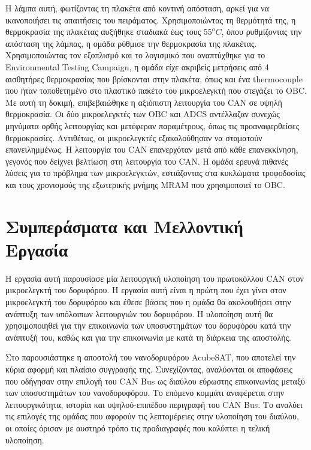 \documentclass[a4paper,nobib,justified]{tufte-book}
\begin{document}
Η λάμπα αυτή, φωτίζοντας τη πλακέτα από κοντινή απόσταση, αρκεί για να ικανοποιήσει τις απαιτήσεις του πειράματος. Χρησιμοποιώντας τη θερμότητά της, η θερμοκρασία της πλακέτας αυξήθηκε σταδιακά έως τους $55^o C$, όπου ρυθμίζοντας την απόσταση της λάμπας, η ομάδα ρύθμισε την θερμοκρασία της πλακέτας. Χρησιμοποιώντας τον εξοπλισμό και το λογισμικό που αναπτύχθηκε για το Environmental Testing Campaign, η ομάδα είχε ακριβείς μετρήσεις από 4 αισθητήρες θερμοκρασίας που βρίσκονται στην πλακέτα, όπως και ένα thermocouple που ήταν τοποθετημένο στο πλαστικό πακέτο του μικροελεγκτή που στεγάζει το OBC. Με αυτή τη δοκιμή, επιβεβαιώθηκε η αξιόπιστη λειτουργία του CAN σε υψηλή θερμοκρασία. Οι δύο μικροελεγκτές των OBC και ADCS αντέλλαζαν συνεχώς μηνύματα ορθής λειτουργίας και μετέφεραν παραμέτρους, όπως τις προαναφερθείσες θερμοκρασίες. Αντιθέτως, οι μικροελεγκτές εξακολούθησαν να σταματούν επανειλημμένως. Η λειτουργία του CAN επανερχόταν μετά από κάθε επανεκκίνηση, γεγονός που δείχνει βελτίωση στη λειτουργία του CAN. Η ομάδα ερευνά πιθανές λύσεις για το πρόβλημα των μικροελεγκτών, εστιάζοντας στα κυκλώματα τροφοδοσίας και τους χρονισμούς της εξωτερικής μνήμης MRAM που χρησιμοποιεί το OBC.

\chapter{Συμπεράσματα και Μελλοντική Εργασία}
\label{future-work}
Η εργασία αυτή παρουσίασε μία λειτουργική υλοποίηση του πρωτοκόλλου CAN στον μικροελεγκτή του δορυφόρου. Η εργασία αυτή είναι η πρώτη που έχει γίνει στον μικροελεγκτή του δορυφόρου και έθεσε βάσεις που η ομάδα θα ακολουθήσει στην ανάπτυξη των υπόλοιπων λειτουργιών του δορυφόρου. Η υλοποίηση αυτή θα χρησιμοποιηθεί για την επικοινωνία των υποσυστημάτων του δορυφόρου κατά την ανάπτυξή του, καθώς και για την επικοινωνία με κατά τη διάρκεια της αποστολής.

Στο  παρουσιάστηκε η αποστολή του νανοδορυφόρου AcubeSAT, που αποτελεί την κύρια αφορμή και πλαίσιο συγγραφής της. Συνεχίζοντας, αναλύονται οι αποφάσεις που οδήγησαν στην επιλογή του CAN Bus ως διαύλου εύρωστης επικοινωνίας μεταξύ των υποσυστημάτων του νανοδορυφόρου. Το επόμενο κομμάτι αναφέρεται στην λειτουργικότητα, ιστορία και υψηλού-επιπέδου περιγραφή του CAN Bus. Το  αναλύει τις επιλογές της ομάδας που αφορούν τις λεπτομέρειες στην υλοποίηση του διαύλου, οι οποίες όρισαν με αυστηρό τρόπο τις προδιαγραφές που καλύπτει η τελική υλοποίηση.
\end{document}
